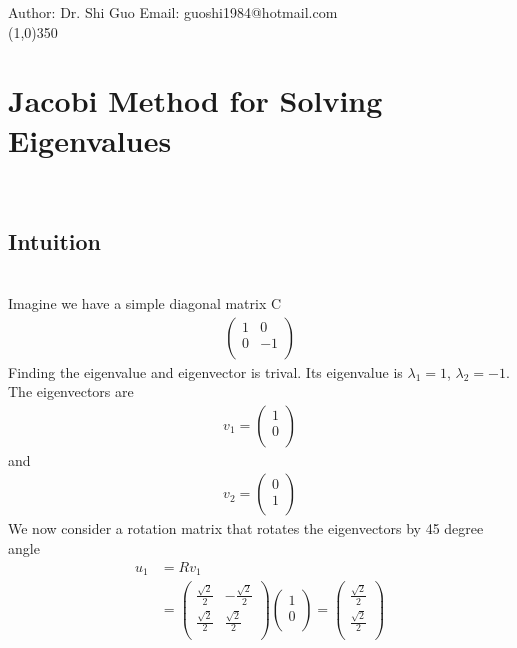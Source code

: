 \documentclass[a4paper]{article}
\begin{document}
Author: Dr. Shi Guo  \hspace{30mm} Email: guoshi1984@hotmail.com\\
\line(1,0){350}
\section{Jacobi Method for Solving Eigenvalues}\\
\subsection{Intuition}\\
Imagine we have a simple diagonal matrix C\\
\begin{align*}
\left( \begin{array}{cc}
1 & 0\\
0 & -1\\
\end{array} \right)
\end{align*}
Finding the eigenvalue and eigenvector is trival. Its eigenvalue is $\lambda_1 = 1$, $\lambda_2 = -1$. The eigenvectors are
\begin{align*}
	v_1 = 
	\left(  \begin{array} {c}
		1 \\
		0 \\
	\end{array} \right) 
\end{align*}
and
\begin{align*}
	v_2 = 
	\left( \begin{array} {c}
		0 \\
		1 \\
	\end{array} \right) 
\end{align*}
We now consider a rotation matrix that rotates the eigenvectors by 45 degree angle
\begin{align*}
	u_1 & = R v_1 \\
	& =\left(  \begin{array} {cc}
		\frac{\sqrt{2}}{2}& -\frac{\sqrt{2}}{2}\\
		\frac{\sqrt{2}}{2}& \frac{\sqrt{2}}{2}\\
	\end{array} \right) 
	\left(  \begin{array} {c}
		1 \\
		0 \\
	\end{array} \right) 
	=
	\left(  \begin{array} {c}
		\frac{\sqrt{2}}{2} \\
		\frac{\sqrt{2}}{2} \\
	\end{array} \right) 
\end{align*}
\end{document}

